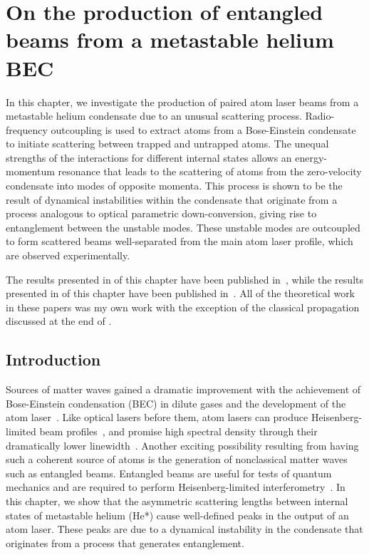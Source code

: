 \chapter{On the production of entangled beams from a metastable helium BEC}
\label{Peaks}
\graphicspath{{Figures/Peaks/}{Figures/Common/}}

In this chapter, we investigate the production of paired atom laser beams from a metastable helium condensate due to an unusual scattering process.  Radio-frequency outcoupling is used to extract atoms from a Bose-Einstein condensate to initiate scattering between trapped and untrapped atoms.  The unequal strengths of the interactions for different internal states allows an energy-momentum resonance that leads to the scattering of atoms from the zero-velocity condensate into modes of opposite momenta.  This process is shown to be the result of dynamical instabilities within the condensate that originate from a process analogous to optical parametric down-conversion, giving rise to entanglement between the unstable modes.  These unstable modes are outcoupled to form scattered beams well-separated from the main atom laser profile, which are observed experimentally.

The results presented in  of this chapter have been published in~\citet{Dennis:2010}, while the results presented in  of this chapter have been published in~\citet{Dall:2009}.  All of the theoretical work in these papers was my own work with the exception of the classical propagation discussed at the end of .

\section{Introduction}
Sources of matter waves gained a dramatic improvement with the achievement of Bose-Einstein condensation (BEC) in dilute gases and the development of the atom laser~\citep{Anderson:1995vn,Bradley:1995ys,Davis:1995,Mewes:1997}. Like optical lasers before them, atom lasers can produce Heisenberg-limited beam profiles~\citep{Busch:2002zr,Riou:2006uq}, and promise high spectral density through their dramatically lower linewidth~\citep{Wiseman:1997ba}. Another exciting possibility resulting from having such a coherent source of atoms is the generation of nonclassical matter waves such as entangled beams. Entangled beams are useful for tests of quantum mechanics and are required to perform Heisenberg-limited interferometry~\citep{Dowling:1998,Reid:1988}.  In this chapter, we show that the asymmetric scattering lengths between internal states of metastable helium (He*) cause well-defined peaks in the output of an atom laser.  These peaks are due to a dynamical instability in the condensate that originates from a process that generates entanglement.

